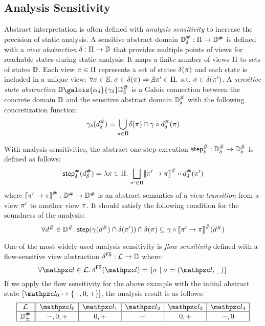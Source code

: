 \subsection{Analysis Sensitivity}\label{sec:sens}

Abstract interpretation is often defined with \textit{analysis sensitivity} to
increase the precision of static analysis.  A sensitive abstract domain
${\mathbb{D}}^{\#}_\delta: \Pi \rightarrow {\mathbb{D}}^{\#}$ is defined with a \textit{view
abstraction} $\delta: \Pi \rightarrow \mathbb{D}$ that provides multiple points
of views for reachable states during static analysis.  It maps a finite number
of views $\Pi$ to sets of states $\mathbb{D}$. Each view $\pi \in \Pi$
represents a set of states $\delta(\pi)$ and each state is included
in a unique view: $\forall \sigma \in \mathbb{S}. \; \sigma \in \delta(\pi)
\Rightarrow \not\exists \pi' \in \Pi.$ s.t. $\sigma \in \delta(\pi')$.
A \textit{sensitive state
abstraction} $\dom \galois{\alpha_\viewmap}{\gamma_\viewmap} \sabsdom$ is a
Galois connection between the concrete domain $\mathbb{D}$ and the sensitive abstract
domain ${\mathbb{D}}^{\#}_\delta$ with the following concretization function:
\[
  \gamma_\delta({{d}^{\#}_\delta}) = \underset{\pi \in \Pi}{\bigcup}
  {\delta(\pi) \cap \gamma \circ {{d}^{\#}_\delta}(\pi)}
\]

With analysis sensitivities, the abstract one-step execution ${\textsf{step}}^{\#}_\delta:
{\mathbb{D}}^{\#}_\delta \rightarrow {\mathbb{D}}^{\#}_\delta$ is defined as follows:
\[
  {\textsf{step}}^{\#}_\delta({{d}^{\#}_\delta}) = \lambda \pi \in \Pi. \; \underset{\pi' \in
  \Pi}{\bigsqcup}{{[\![{\pi' \rightarrow \pi}]\!]}^{\#} \circ {{d}^{\#}_\delta}(\pi')}
\]
where ${[\![{\pi' \rightarrow \pi}]\!]}^{\#}: {\mathbb{D}}^{\#} \rightarrow {\mathbb{D}}^{\#}$ is an abstract
semantics of a \textit{view transition} from a view $\pi'$ to another view
$\pi$.  It should satisfy the following condition for the soundness of the
analysis:
\[
  \forall {d}^{\#} \in {\mathbb{D}}^{\#}. \; \textsf{step}(\gamma({d}^{\#}) \cap \delta(\pi'))
  \cap \delta(\pi) \subseteq \gamma \circ
  {[\![{\pi' \rightarrow \pi}]\!]}^{\#}({d}^{\#})
\]

One of the most widely-used analysis sensitivity is \textit{flow sensitivity}
defined with a flow-sensitive view abstraction $\delta^{\textsf{FS}}: \mathcal{L}
\rightarrow \mathbb{D}$ where:
\[
  \forall \lab\in\labset. \; \fsviewmap(\lab) = \{ \st \mid \st = (\lab, \_) \}
\]
If we apply the flow sensitivity for the above example with the initial abstract
state $[ \lab_0 \mapsto \{ -, 0, + \} ]$, the analysis result is as follows:
\[
  \begin{array}{|c||c|c|c|c|c|}\hline
    \labset & \lab_0 & \lab_1 & \lab_2 & \lab_3 & \lab_4\\\hline
    \absdom_\pm & -, 0, + & 0, + & - & 0, + & -, 0\\\hline
  \end{array}
\]


